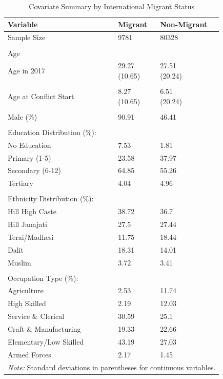 \begin{table}[!h]
\centering
\caption{\label{tab:migrant_summary}Covariate Summary by International Migrant Status}
\centering
\fontsize{10}{12}\selectfont
\begin{tabular}[t]{lll}
\toprule
Variable & Migrant & Non-Migrant\\
\midrule
Sample Size & 9781 & 80328\\
 &  & \\
Age &  & \\
Age in 2017 & \makecell[l]{29.27 \\ (10.65)} & \makecell[l]{27.51 \\ (20.24)}\\
 &  & \\
\addlinespace
Age at Conflict Start & \makecell[l]{8.27 \\ (10.65)} & \makecell[l]{6.51 \\ (20.24)}\\
 &  & \\
Male (\%) & 90.91 & 46.41\\
 &  & \\
Education Distribution (\%): &  & \\
\addlinespace
No Education & 7.53 & 1.81\\
Primary (1-5) & 23.58 & 37.97\\
Secondary (6-12) & 64.85 & 55.26\\
Tertiary & 4.04 & 4.96\\
 &  & \\
\addlinespace
Ethnicity Distribution (\%): &  & \\
Hill High Caste & 38.72 & 36.7\\
Hill Janajati & 27.5 & 27.44\\
Terai/Madhesi & 11.75 & 18.44\\
Dalit & 18.31 & 14.01\\
\addlinespace
Muslim & 3.72 & 3.41\\
 &  & \\
Occupation Type (\%): &  & \\
Agriculture & 2.53 & 11.74\\
High Skilled & 2.19 & 12.03\\
\addlinespace
Service \& Clerical & 30.59 & 25.1\\
Craft \& Manufacturing & 19.33 & 22.66\\
Elementary/Low Skilled & 43.19 & 27.03\\
Armed Forces & 2.17 & 1.45\\
\bottomrule
\multicolumn{3}{l}{\rule{0pt}{1em}\textit{Note: } Standard deviations in parentheses for continuous variables.}\\
\end{tabular}
\end{table}

